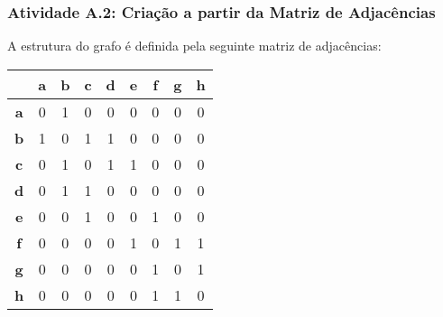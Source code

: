 \documentclass[a4paper,12pt]{article}
\begin{document}
\subsubsection*{Atividade A.2: Criação a partir da Matriz de Adjacências}
A estrutura do grafo é definida pela seguinte matriz de adjacências:
\begin{center}
\scriptsize
\begin{tabular*}{\textwidth}{c|@{\extracolsep{\fill}}cccccccc}
\rowcolor[gray]{0.9}
 & \textbf{a} & \textbf{b} & \textbf{c} & \textbf{d} & \textbf{e} & \textbf{f} & \textbf{g} & \textbf{h} \\
\hline
\textbf{a} & 0 & 1 & 0 & 0 & 0 & 0 & 0 & 0 \\
\textbf{b} & 1 & 0 & 1 & 1 & 0 & 0 & 0 & 0 \\
\textbf{c} & 0 & 1 & 0 & 1 & 1 & 0 & 0 & 0 \\
\textbf{d} & 0 & 1 & 1 & 0 & 0 & 0 & 0 & 0 \\
\textbf{e} & 0 & 0 & 1 & 0 & 0 & 1 & 0 & 0 \\
\textbf{f} & 0 & 0 & 0 & 0 & 1 & 0 & 1 & 1 \\
\textbf{g} & 0 & 0 & 0 & 0 & 0 & 1 & 0 & 1 \\
\textbf{h} & 0 & 0 & 0 & 0 & 0 & 1 & 1 & 0 \\
\end{tabular*}
\end{center}
\end{document}
